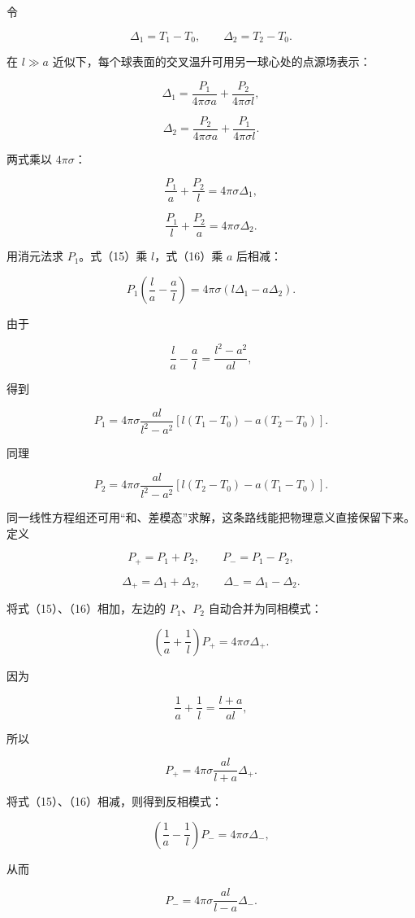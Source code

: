 \documentclass[12pt,a4paper,UTF8]{ctexart}
\begin{document}
令

\[
\Delta_1=T_1-T_0,
\qquad
\Delta_2=T_2-T_0.
\tag{12}
\]

在 \(l\gg a\) 近似下，每个球表面的交叉温升可用另一球心处的点源场表示：

\[
\Delta_1
=\frac{P_1}{4\pi\sigma a}
+\frac{P_2}{4\pi\sigma l},
\tag{13}
\]

\[
\Delta_2
=\frac{P_2}{4\pi\sigma a}
+\frac{P_1}{4\pi\sigma l}.
\tag{14}
\]

两式乘以 \(4\pi\sigma\)：

\[
\frac{P_1}{a}+\frac{P_2}{l}=4\pi\sigma\Delta_1,
\tag{15}
\]

\[
\frac{P_1}{l}+\frac{P_2}{a}=4\pi\sigma\Delta_2.
\tag{16}
\]

用消元法求 \(P_1\)。式（15）乘 \(l\)，式（16）乘 \(a\) 后相减：

\[
P_1\left(\frac la-\frac al\right)
=4\pi\sigma(l\Delta_1-a\Delta_2).
\tag{17}
\]

由于

\[
\frac la-\frac al=\frac{l^2-a^2}{al},
\tag{18}
\]

得到

\[
\boxed{
P_1
=4\pi\sigma\frac{al}{l^2-a^2}
\left[l(T_1-T_0)-a(T_2-T_0)\right]
}.
\tag{19}
\]

同理

\[
\boxed{
P_2
=4\pi\sigma\frac{al}{l^2-a^2}
\left[l(T_2-T_0)-a(T_1-T_0)\right]
}.
\tag{20}
\]

同一线性方程组还可用``和、差模态''求解，这条路线能把物理意义直接保留下来。定义

\[
P_+=P_1+P_2,
\qquad P_-=P_1-P_2,
\tag{20a}
\]

\[
\Delta_+=\Delta_1+\Delta_2,
\qquad \Delta_-=\Delta_1-\Delta_2.
\tag{20b}
\]

将式（15）、（16）相加，左边的 \(P_1\)、\(P_2\) 自动合并为同相模式：

\[
\left(\frac1a+\frac1l\right)P_+
=4\pi\sigma\Delta_+.
\tag{20c}
\]

因为

\[
\frac1a+\frac1l=\frac{l+a}{al},
\]

所以

\[
P_+=4\pi\sigma\frac{al}{l+a}\Delta_+.
\tag{20d}
\]

将式（15）、（16）相减，则得到反相模式：

\[
\left(\frac1a-\frac1l\right)P_-
=4\pi\sigma\Delta_-,
\tag{20e}
\]

从而

\[
P_-=4\pi\sigma\frac{al}{l-a}\Delta_-.
\tag{20f}
\]
\end{document}
